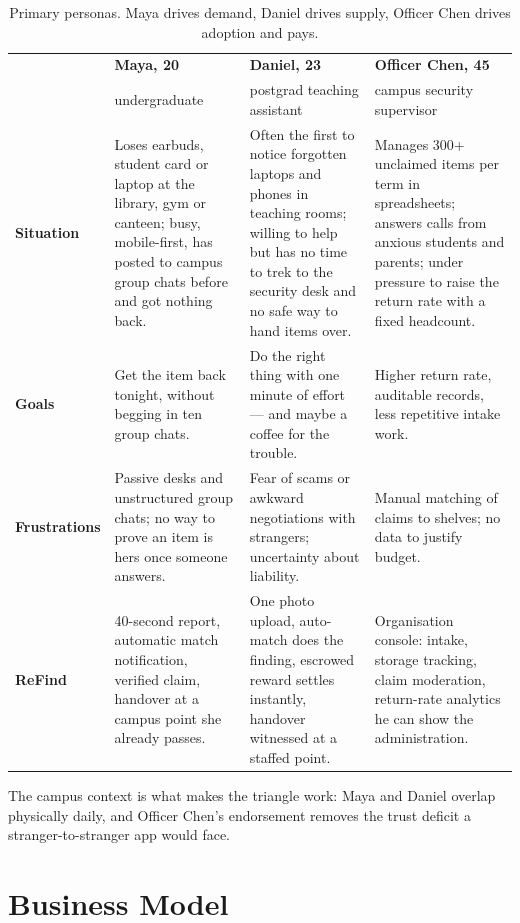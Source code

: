 \documentclass[11pt,a4paper]{article}
\begin{document}
\begin{table}[H]
\centering
\footnotesize
\renewcommand{\arraystretch}{1.4}
\begin{tabularx}{\textwidth}{>{\sffamily\bfseries}p{1.7cm} Y Y Y}
\toprule
 & \textbf{Maya, 20} & \textbf{Daniel, 23} & \textbf{Officer Chen, 45} \\
 & undergraduate & postgrad teaching assistant & campus security supervisor \\
\midrule
Situation & Loses earbuds, student card or laptop at the library, gym or canteen; busy,
mobile-first, has posted to campus group chats before and got nothing back. & Often the
first to notice forgotten laptops and phones in teaching rooms; willing to help but has
no time to trek to the security desk and no safe way to hand items over. & Manages 300+
unclaimed items per term in spreadsheets; answers calls from anxious students and
parents; under pressure to raise the return rate with a fixed headcount. \\
Goals & Get the item back tonight, without begging in ten group chats. & Do the right
thing with one minute of effort --- and maybe a coffee for the trouble. & Higher return
rate, auditable records, less repetitive intake work. \\
Frustrations & Passive desks and unstructured group chats; no way to prove an item is
hers once someone answers. & Fear of scams or awkward negotiations with strangers;
uncertainty about liability. & Manual matching of claims to shelves; no data to justify
budget. \\
ReFind & 40-second report, automatic match notification, verified claim, handover
at a campus point she already passes. & One photo upload, auto-match does the finding,
escrowed reward settles instantly, handover witnessed at a staffed point. & Organisation
console: intake, storage tracking, claim moderation, return-rate analytics he can show
the administration. \\
\bottomrule
\end{tabularx}
\caption{Primary personas. Maya drives demand, Daniel drives supply, Officer Chen drives
adoption and pays.}
\end{table}

The campus context is what makes the triangle work: Maya and Daniel overlap physically
daily, and Officer Chen's endorsement removes the trust deficit a stranger-to-stranger
app would face.

\section{Business Model}
\label{sec:business-model}
\end{document}
